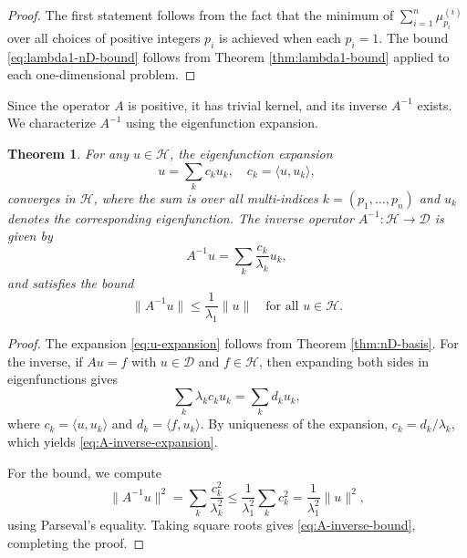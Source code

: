 \documentclass{article}
\newtheorem{theorem}{Theorem}[section]
\numberwithin{equation}{section}
\numberwithin{theorem}{section}
\begin{document}
\begin{proof}
The first statement follows from the fact that the minimum of $\displaystyle\sum_{i=1}^{n} \mu_{p_i}^{(i)}$ over all choices of positive integers $p_i$ is achieved when each $p_i = 1$. The bound \eqref{eq:lambda1-nD-bound} follows from Theorem \ref{thm:lambda1-bound} applied to each one-dimensional problem.
\end{proof}

Since the operator $A$ is positive, it has trivial kernel, and its inverse $A^{-1}$ exists. We characterize $A^{-1}$ using the eigenfunction expansion.

\begin{theorem}\label{thm:nD-inverse}
For any $u \in \mathscr{H}$, the eigenfunction expansion
\begin{equation}\label{eq:u-expansion}
u = \sum_{k} c_k u_k, \quad c_k = \langle u, u_k \rangle,
\end{equation}
converges in $\mathscr{H}$, where the sum is over all multi-indices $k = (p_1, \ldots, p_n)$ and $u_k$ denotes the corresponding eigenfunction. The inverse operator $A^{-1}\colon \mathscr{H} \to \mathscr{D}$ is given by
\begin{equation}\label{eq:A-inverse-expansion}
A^{-1}u = \sum_{k} \frac{c_k}{\lambda_k} u_k,
\end{equation}
and satisfies the bound
\begin{equation}\label{eq:A-inverse-bound}
\|A^{-1}u\| \leq \frac{1}{\lambda_1} \|u\| \quad \text{for all } u \in \mathscr{H}.
\end{equation}
\end{theorem}

\begin{proof}
The expansion \eqref{eq:u-expansion} follows from Theorem \ref{thm:nD-basis}. For the inverse, if $Au = f$ with $u \in \mathscr{D}$ and $f \in \mathscr{H}$, then expanding both sides in eigenfunctions gives
\[
\sum_k \lambda_k c_k u_k = \sum_k d_k u_k,
\]
where $c_k = \langle u, u_k \rangle$ and $d_k = \langle f, u_k \rangle$. By uniqueness of the expansion, $c_k = d_k / \lambda_k$, which yields \eqref{eq:A-inverse-expansion}.

For the bound, we compute
\[
\|A^{-1}u\|^2 = \sum_k \frac{c_k^2}{\lambda_k^2} \leq \frac{1}{\lambda_1^2} \sum_k c_k^2 = \frac{1}{\lambda_1^2} \|u\|^2,
\]
using Parseval's equality. Taking square roots gives \eqref{eq:A-inverse-bound}, completing the proof.
\end{proof}
\end{document}
